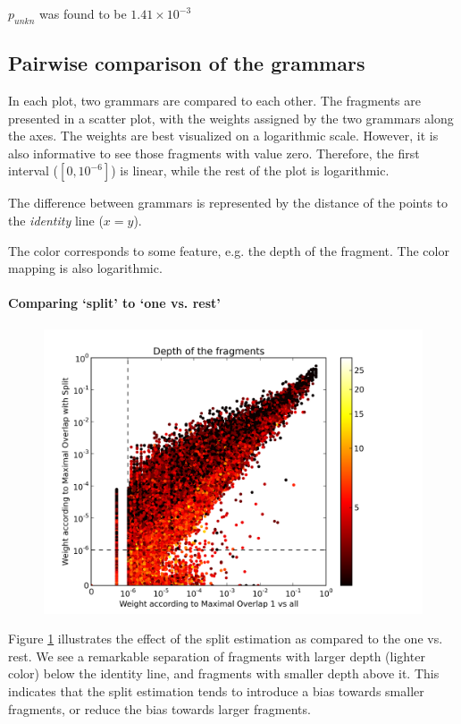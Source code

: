 $p_{unkn}$ was found to be $1.41\times 10^{-3}$%




\subsection{Pairwise comparison of the grammars}
In each plot, two grammars are compared to each other. The fragments are presented in a scatter plot, with the weights assigned by the two grammars along the axes. The weights are best visualized on a logarithmic scale. However, it is also informative to see those fragments with value zero. Therefore, the first interval ($[0,10^{-6}]$) is linear, while the rest of the plot is logarithmic. %

The difference between grammars is represented by the distance of the points to the \emph{identity} line ($x=y$).

The color corresponds to some feature, e.g. the depth of the fragment. The color mapping is also logarithmic. 


\paragraph{Comparing `split' to `one vs. rest'}
\begin{figure}
\center
\includegraphics[width=\linewidth]{../data/plots/32.png}
\label{f:ddop-ddops-depth}
\end{figure}

Figure \ref{f:ddop-ddops-depth} illustrates the effect of the split estimation as compared to the one vs. rest. We see a remarkable separation of fragments with larger depth (lighter color) below the identity line, and fragments with smaller depth above it. This indicates that the split estimation tends to introduce a bias towards smaller fragments, or reduce the bias towards larger fragments.

